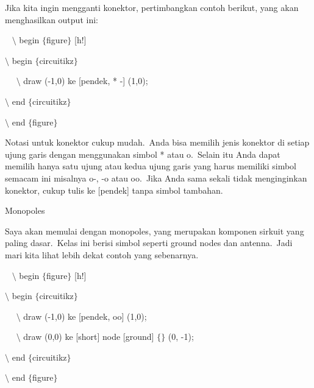 \noindent 
Jika kita ingin mengganti konektor, pertimbangkan contoh berikut, yang akan menghasilkan output ini:
\par


\noindent 
~ $\setminus$ begin $ \{ $figure$ \} $ [h!]
\par


\noindent 
 $\setminus$ begin $ \{ $circuitikz$ \} $
\par


\noindent 
~~ $\setminus$ draw (-1,0) ke [pendek, * -] (1,0);
\par


\noindent 
 $\setminus$ end $ \{ $circuitikz$ \} $
\par


\noindent 
 $\setminus$ end $ \{ $figure$ \} $ 
\par


\noindent 
Notasi untuk konektor cukup mudah. Anda bisa memilih jenis konektor di setiap ujung garis dengan menggunakan simbol * atau o. Selain itu Anda dapat memilih hanya satu ujung atau kedua ujung garis yang harus memiliki simbol semacam ini misalnya o-, -o atau oo. Jika Anda sama sekali tidak menginginkan konektor, cukup tulis ke [pendek] tanpa simbol tambahan.
\par


\noindent 
Monopoles
\par


\noindent 
Saya akan memulai dengan monopoles, yang merupakan komponen sirkuit yang paling dasar. Kelas ini berisi simbol seperti ground nodes dan antenna. Jadi mari kita lihat lebih dekat contoh yang sebenarnya.
\par


\noindent 
~ $\setminus$ begin $ \{ $figure$ \} $ [h!]
\par


\noindent 
 $\setminus$ begin $ \{ $circuitikz$ \} $
\par


\noindent 
~~ $\setminus$ draw (-1,0) ke [pendek, oo] (1,0);
\par


\noindent 
~~ $\setminus$ draw (0,0) ke [short] node [ground] $ \{ $$ \} $ (0, -1);
\par


\noindent 
 $\setminus$ end $ \{ $circuitikz$ \} $
\par


\noindent 
 $\setminus$ end $ \{ $figure$ \} $ 
\par


